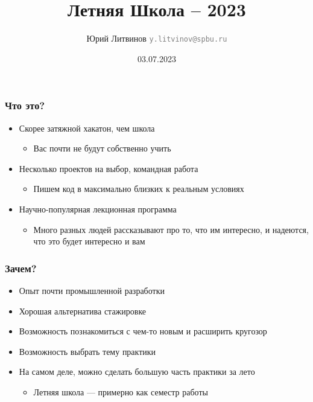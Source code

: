 \documentclass[xetex,mathserif,serif]{beamer}
\title{Летняя Школа -- 2023}
\author[Юрий Литвинов]{Юрий Литвинов \newline \textcolor{gray}{\small\texttt{y.litvinov@spbu.ru}}}
\date{03.07.2023}
\begin{document}
    \frame{\titlepage}

    \begin{frame}
        \frametitle{Что это?}
        \begin{itemize}
            \item Скорее затяжной хакатон, чем школа
            \begin{itemize}
                \item Вас почти не будут собственно учить
            \end{itemize}
            \item Несколько проектов на выбор, командная работа
            \begin{itemize}
                \item Пишем код в максимально близких к реальным условиях
            \end{itemize}
            \item Научно-популярная лекционная программа
            \begin{itemize}
                \item Много разных людей рассказывают про то, что им интересно, и надеются, что это будет интересно и вам
            \end{itemize}
        \end{itemize}
    \end{frame}

    \begin{frame}
        \frametitle{Зачем?}
        \begin{itemize}
            \item Опыт почти промышленной разработки
            \item Хорошая альтернатива стажировке
            \item Возможность познакомиться с чем-то новым и расширить кругозор
            \item Возможность выбрать тему практики
            \item На самом деле, можно сделать большую часть практики за лето
            \begin{itemize}
                \item Летняя школа --- примерно как семестр работы
            \end{itemize}
        \end{itemize}
    \end{frame}
\end{document}

